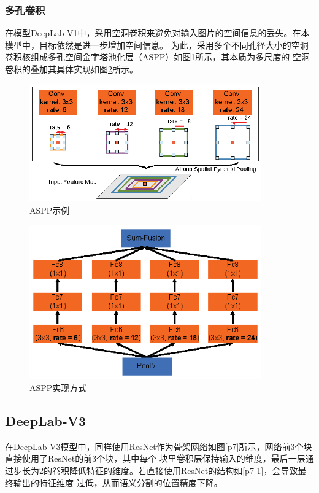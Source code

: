 \documentclass[10pt, a4paper]{article}
\begin{document}
\subsubsection{多孔卷积}
在模型DeepLab-V1中，采用空洞卷积来避免对输入图片的空间信息的丢失。在本模型中，目标依然是进一步增加空间信息。
为此，采用多个不同孔径大小的空洞卷积核组成多孔空间金字塔池化层（ASPP）如图\ref{p5}所示，其本质为多尺度的
空洞卷积的叠加其具体实现如图\ref{p6}所示。
\begin{figure}[h]
    \centering
    \includegraphics[width=10cm]{imgs/p5.eps}
    \caption{ASPP示例}
    \label{p5}
\end{figure}

\begin{figure}[h]
    \centering
    \includegraphics[width=10cm]{imgs/p6.eps}
    \caption{ASPP实现方式}
    \label{p6}
\end{figure}

\subsection{DeepLab-V3}
在DeepLab-V3模型中，同样使用ResNet作为骨架网络如图\ref{p7}所示，网络前3个块直接使用了ResNet的前3个块，其中每个
块里卷积层保持输入的维度，最后一层通过步长为2的卷积降低特征的维度。若直接使用ResNet的结构如\ref{p7-1}，会导致最终输出的特征维度
过低，从而语义分割的位置精度下降。
\end{document}
